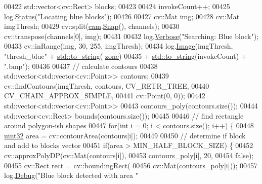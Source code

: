 \begin{DoxyCode}
00422         std::vector<cv::Rect> blocks;   
00423 
00424         invokeCount++;
00425         log.\hyperlink{classChipChipArray_1_1Log_a66575b6e94c6112e4cefa5736cb996e0}{Status}(\textcolor{stringliteral}{"Locating blue blocks"});
00426 
00427         cv::Mat img;
00428         cv::Mat imgThresh;
00429         cv::split(\hyperlink{classChipChipArray_1_1Grabber_a726bcc2367a719cb84de92a981947622}{cam}.\hyperlink{classChipChipArray_1_1PiCamera_a58fb0de02570dce9a9cb60a1a04fb84f}{Snap}(), channels);
00430         cv::transpose(channels[0], img);
00431 
00432         log.\hyperlink{classChipChipArray_1_1Log_a154a5f38d9c7a767693b242684a3d4d9}{Verbose}(\textcolor{stringliteral}{"Searching: Blue block"});
00433         cv::inRange(img, 30, 255, imgThresh);
00434         log.\hyperlink{classChipChipArray_1_1Log_a65bbab057c8b1453f9e4efcfee7522c4}{Image}(imgThresh, \textcolor{stringliteral}{"thresh\_blue"} + \hyperlink{namespacestd_aa5ddf582a1c96ffe258c997be9a294a3}{std::to\_string}(
      \hyperlink{classChipChipArray_1_1Grabber_ab57efe6e0b6f369b19528285a278d967}{zone})
00435                 + \hyperlink{namespacestd_aa5ddf582a1c96ffe258c997be9a294a3}{std::to\_string}(invokeCount) + \textcolor{stringliteral}{".bmp"});
00436 
00437         \textcolor{comment}{// calculate contours}
00438         std::vector<std::vector<cv::Point>> contours;
00439         cv::findContours(imgThresh, contours, CV\_RETR\_TREE,
00440                 CV\_CHAIN\_APPROX\_SIMPLE,
00441                 cv::Point(0, 0));
00442         std::vector<std::vector<cv::Point>>
00443             contours\_poly(contours.size());
00444         std::vector<cv::Rect> bounds(contours.size());
00445 
00446         \textcolor{comment}{// find rectangle around polygon-ish shapes}
00447         \textcolor{keywordflow}{for}(\textcolor{keywordtype}{int} i = 0; i < contours.size(); i++) \{
00448             \hyperlink{definitions_8hpp_a1134b580f8da4de94ca6b1de4d37975e}{uint32} area = cv::contourArea(contours[i]);
00449 
00450             \textcolor{comment}{// determine if block and add to blocks vector}
00451             \textcolor{keywordflow}{if}(area > MIN\_HALF\_BLOCK\_SIZE) \{
00452                 cv::approxPolyDP(cv::Mat(contours[i]),
00453                         contours\_poly[i], 20,
00454                         \textcolor{keyword}{false});
00455                 cv::Rect rect = cv::boundingRect(
00456                         cv::Mat(contours\_poly[i]));
00457                 log.\hyperlink{classChipChipArray_1_1Log_ac32b435af1577e4ebc67af2bdfea8eff}{Debug}(\textcolor{stringliteral}{"Blue block detected with area "}

\end{DoxyCode}
